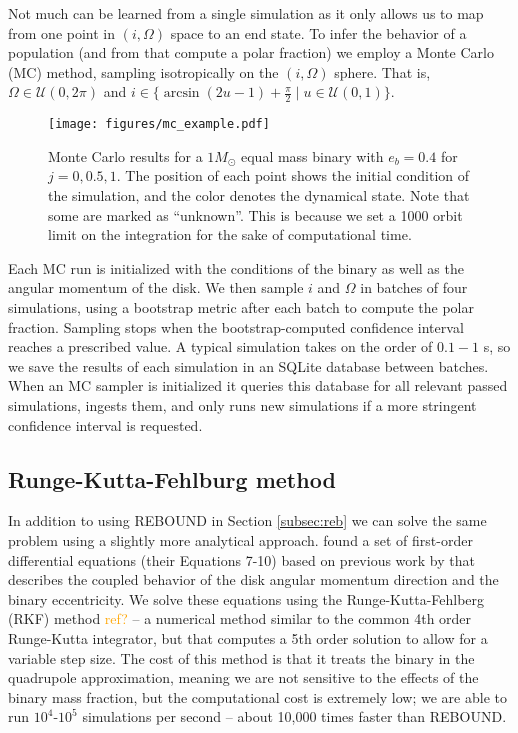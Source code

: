 \documentclass[twocolumn]{aastex631}
\newcommand{\TJ}[1]{\textcolor{orange}{#1}}
\begin{document}
Not much can be learned from a single simulation as it only allows us to map from one point in $(i,\Omega)$ space to an end state. To infer the behavior of a population
(and from that compute a polar fraction) we employ a Monte Carlo (MC) method, sampling isotropically on the $(i,\Omega)$ sphere. That is, $\Omega \in \mathcal{U}(0,2\pi)$
and $i \in \{\arcsin{(2u-1)} + \frac{\pi}{2} \mid u \in \mathcal{U}(0,1)\}$.

\begin{figure*}
    \begin{centering}
        \texttt{[image: figures/mc\_example.pdf]}
        \caption{Monte Carlo results for a $1 M_\odot$ equal mass binary with $e_b=0.4$ for $j=0,0.5,1$. The position of each
        point shows the initial condition of the simulation, and the color denotes the dynamical state. Note that some are marked
        as ``unknown''. This is because we set a 1000 orbit limit on the integration for the sake of computational time.}
        \label{fig:mc}
    \end{centering}
\end{figure*}

Each MC run is initialized with the conditions of the binary as well as the angular momentum of the disk. We then sample $i$ and $\Omega$ in batches of four simulations,
using a bootstrap metric after each batch to compute the polar fraction. Sampling stops when the bootstrap-computed confidence interval reaches a prescribed value. A 
typical simulation takes on the order of $0.1-1$ s, so we save the results of each simulation in an SQLite database between batches. When an MC sampler is initialized
it queries this database for all relevant passed simulations, ingests them, and only runs new simulations if a more stringent confidence interval is requested.

\subsection{Runge-Kutta-Fehlburg method}
\label{subsec:rk}

In addition to using {\sc REBOUND} in Section \ref{subsec:reb} we can solve the same problem using a slightly more analytical approach. \citet{martin2019} found
a set of first-order differential equations (their Equations 7-10) based on previous work by \citet{farago2010} that describes the coupled behavior of the
disk angular momentum direction and the binary eccentricity. We solve these equations using the Runge-Kutta-Fehlberg (RKF) method \TJ{ref?} -- a numerical method similar
to the common 4th order Runge-Kutta integrator, but that computes a 5th order solution to allow for a variable step size. The cost of this method is that it treats
the binary in the quadrupole approximation, meaning we are not sensitive to the effects of the binary mass fraction, but the computational cost is extremely low; we are
able to run $10^4$-$10^5$ simulations per second -- about 10,000 times faster than {\sc REBOUND}.
\end{document}
